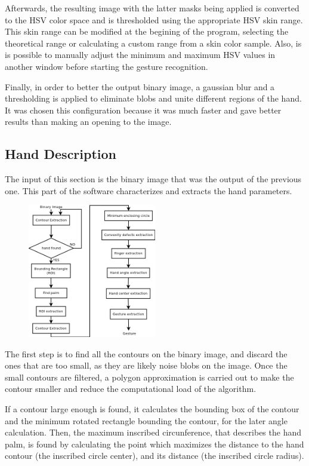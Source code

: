 Afterwards, the resulting image with the latter masks being applied is converted to the HSV color space and is thresholded using the appropriate HSV skin range.
This skin range can be modified at the begining of the program, selecting the theoretical range or calculating a custom range from a skin color sample. Also, is is possible to manually adjust the minimum and maximum HSV values in another window before starting the gesture recognition. 

Finally, in order to better the output binary image, a gaussian blur and a thresholding is applied to eliminate blobs and unite different regions of the hand. It was chosen this configuration because it was much faster and gave better results than making an opening to the image. 

 
\subsection{Hand Description}

The input of this section is the binary image that was the output of the previous one. This part of the software characterizes and extracts the hand parameters. 

\begin{figure}[H]
	\centering
	\includegraphics[width=0.5\textwidth]{../images/hand_description.png} 
\end{figure}


The first step is to find all the contours on the binary image, and discard the ones that are too small, as they are likely noise blobs on the image. Once the small contours are filtered, a polygon approximation is carried out to make the contour smaller and reduce the computational load of the algorithm.

If a contour large enough is found, it calculates the bounding box of the contour and the minimum rotated rectangle bounding the contour, for the later angle calculation. Then, the maximum inscribed circunference, that describes the hand palm, is found by calculating the point which maximizes the distance to the hand contour (the inscribed circle center), and its distance (the inscribed circle radius).

